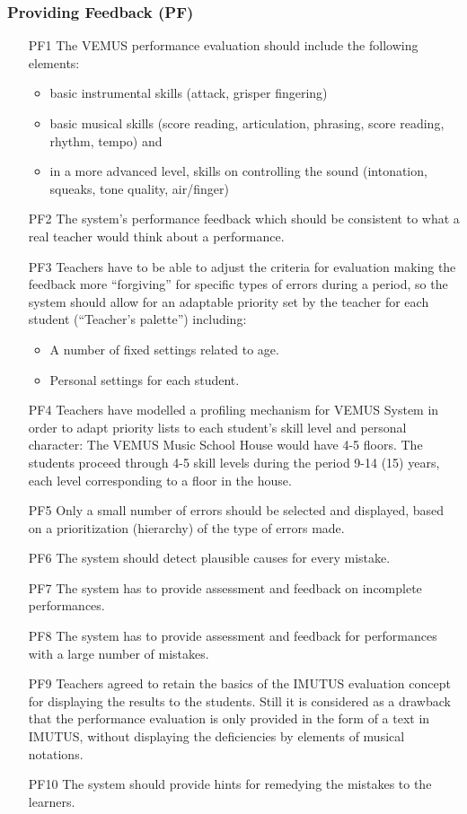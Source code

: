 \subsubsection{Providing Feedback (PF)}
\begin{itemize}
\item[PF1] The VEMUS performance evaluation should include the following elements:\begin{itemize}
\item basic instrumental skills (attack, grisper fingering)
\item basic musical skills (score reading, articulation, phrasing, score reading, rhythm, tempo) and
\item in a more advanced level, skills on controlling the sound (intonation, squeaks, tone quality, air/finger)
\end{itemize}

\item[PF2] The system’s performance feedback which should be consistent to what a real teacher would think about a performance.
\item[PF3] Teachers have to be able to adjust the criteria for evaluation making the feedback more “forgiving” for specific types of errors during a period, so the system should allow for an adaptable priority set by the teacher for each student (“Teacher’s palette”) including:\begin{itemize}
\item A number of fixed settings related to age.
\item Personal settings for each student.
\end{itemize}

\item[PF4] Teachers have modelled a profiling mechanism for VEMUS System in order to adapt priority lists to each student’s skill level and personal character: The VEMUS Music School House would have 4-5 floors. The students proceed through 4-5 skill levels during the period 9-14 (15) years, each level corresponding to a floor in the house.
\item[PF5] Only a small number of errors should be selected and displayed, based on a prioritization (hierarchy) of the type of errors made.
\item[PF6] The system should detect plausible causes for every mistake.
\item[PF7] The system has to provide assessment and feedback on incomplete performances.
\item[PF8] The system has to provide assessment and feedback for performances with a large number of mistakes.
\item[PF9] Teachers agreed to retain the basics of the IMUTUS evaluation concept for displaying the results to the students. Still it is considered as a drawback that the performance evaluation is only provided in the form of a text in IMUTUS, without displaying the deficiencies by elements of musical notations.
\item[PF10] The system should provide hints for remedying the mistakes to the learners.
\end{itemize}


